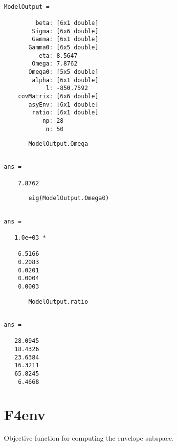 \documentclass[a4paper,11pt,openany]{memoir}
\begin{document}
        \color{lightgray}\ttfamily \begin{verbatim}

ModelOutput = 

         beta: [6x1 double]
        Sigma: [6x6 double]
        Gamma: [6x1 double]
       Gamma0: [6x5 double]
          eta: 8.5647
        Omega: 7.8762
       Omega0: [5x5 double]
        alpha: [6x1 double]
            l: -850.7592
    covMatrix: [6x6 double]
       asyEnv: [6x1 double]
        ratio: [6x1 double]
           np: 28
            n: 50
\end{verbatim} \rmfamily
\color{black}
\begin{verbatim}
       ModelOutput.Omega
       \end{verbatim}

        \color{lightgray}\ttfamily \begin{verbatim}

ans =

    7.8762
\end{verbatim} \rmfamily
\color{black}
\begin{verbatim}
       eig(ModelOutput.Omega0)
       \end{verbatim}
        \color{lightgray}\ttfamily \begin{verbatim}

ans =

   1.0e+03 *

    6.5166
    0.2083
    0.0201
    0.0004
    0.0003

\end{verbatim} \rmfamily
\color{black}
\begin{verbatim}
       ModelOutput.ratio
       \end{verbatim}
        \color{lightgray}\ttfamily \begin{verbatim}

ans =

   28.0945
   18.4326
   23.6384
   16.3211
   65.8245
    6.4668

\end{verbatim} \rmfamily
\color{black}

\newpage


\rmfamily
\color{black}\section{F4env}

\begin{par}
Objective function for computing the envelope subspace.
\end{par} \vspace{1em}
\end{document}

